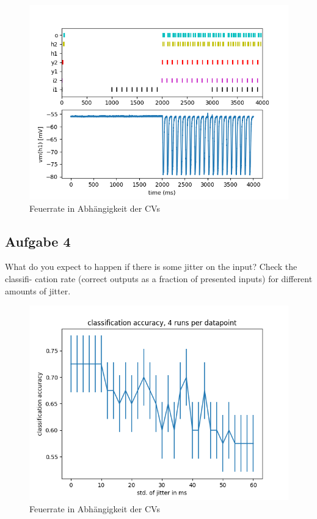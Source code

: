 \documentclass[10pt,a4paper]{scrartcl}
\begin{document}
\begin{figure} [ht]
\begin{center}
\label{fig:abb4}
\caption{Feuerrate in Abhängigkeit der CVs}
\includegraphics[scale=0.45]{pictures/aufgabe7_3.png}
\end{center}
\end{figure}


\subsection{Aufgabe 4}
What do you expect to happen if there is some jitter on the input? Check the classifi-
cation rate (correct outputs as a fraction of presented inputs) for different amounts of
jitter.

\begin{figure} [ht]
\begin{center}
\label{fig:abb4}
\caption{Feuerrate in Abhängigkeit der CVs}
\includegraphics[scale=0.45]{pictures/jitter_plot_lang.png}
\end{center}
\end{figure}
\end{document}
